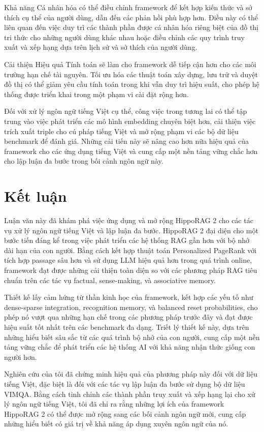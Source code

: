 \documentclass[../main.tex]{subfiles}
\begin{document}
Khả năng Cá nhân hóa có thể điều chỉnh framework để kết hợp kiến thức và sở thích cụ thể của người dùng, dẫn đến các phản hồi phù hợp hơn. Điều này có thể liên quan đến việc duy trì các thành phần được cá nhân hóa riêng biệt của đồ thị tri thức cho những người dùng khác nhau hoặc điều chỉnh các quy trình truy xuất và xếp hạng dựa trên lịch sử và sở thích của người dùng.

Cải thiện Hiệu quả Tính toán sẽ làm cho framework dễ tiếp cận hơn cho các môi trường hạn chế tài nguyên. Tối ưu hóa các thuật toán xây dựng, lưu trữ và duyệt đồ thị có thể giảm yêu cầu tính toán trong khi vẫn duy trì hiệu suất, cho phép hệ thống được triển khai trong một phạm vi cài đặt rộng hơn.

Đối với xử lý ngôn ngữ tiếng Việt cụ thể, công việc trong tương lai có thể tập trung vào việc phát triển các mô hình embedding chuyên biệt hơn, cải thiện việc trích xuất triple cho cú pháp tiếng Việt và mở rộng phạm vi các bộ dữ liệu benchmark để đánh giá. Những cải tiến này sẽ nâng cao hơn nữa hiệu quả của framework cho các ứng dụng tiếng Việt và cung cấp một nền tảng vững chắc hơn cho lập luận đa bước trong bối cảnh ngôn ngữ này.

\section{Kết luận}
Luận văn này đã khám phá việc ứng dụng và mở rộng HippoRAG 2 cho các tác vụ xử lý ngôn ngữ tiếng Việt và lập luận đa bước. HippoRAG 2 đại diện cho một bước tiến đáng kể trong việc phát triển các hệ thống RAG gần hơn với bộ nhớ dài hạn của con người. Bằng cách kết hợp thuật toán Personalized PageRank với tích hợp passage sâu hơn và sử dụng LLM hiệu quả hơn trong quá trình online, framework đạt được những cải thiện toàn diện so với các phương pháp RAG tiêu chuẩn trên các tác vụ factual, sense-making, và associative memory.

Thiết kế lấy cảm hứng từ thần kinh học của framework, kết hợp các yếu tố như dense-sparse integration, recognition memory, và balanced reset probabilities, cho phép nó vượt qua những hạn chế trong các phương pháp trước đây và đạt được hiệu suất tốt nhất trên các benchmark đa dạng. Triết lý thiết kế này, dựa trên những hiểu biết sâu sắc từ các quá trình bộ nhớ của con người, cung cấp một nền tảng vững chắc để phát triển các hệ thống AI với khả năng nhận thức giống con người hơn.

Nghiên cứu của tôi đã chứng minh hiệu quả của phương pháp này đối với dữ liệu tiếng Việt, đặc biệt là đối với các tác vụ lập luận đa bước sử dụng bộ dữ liệu VIMQA. Bằng cách tinh chỉnh các thành phần truy xuất và xếp hạng lại cho xử lý ngôn ngữ tiếng Việt, tôi đã chỉ ra rằng những lợi ích của framework HippoRAG 2 có thể được mở rộng sang các bối cảnh ngôn ngữ mới, cung cấp những hiểu biết có giá trị về khả năng áp dụng xuyên ngôn ngữ của nó.
\end{document}
